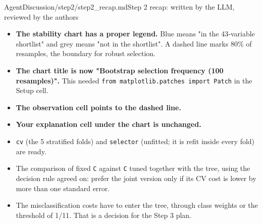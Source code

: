 \begin{mdfile}{AgentDiscussion/\allowbreak{}step2/\allowbreak{}step2\_recap.md}{Step 2 recap: written by the LLM, reviewed by the authors}
\begin{itemize}
\tightlist
\item
  \textbf{The stability chart has a proper legend.} Blue means "in the 43-variable shortlist" and grey means "not in the shortlist". A dashed line marks 80\% of resamples, the boundary for robust selection.
\item
  \textbf{The chart title is now "Bootstrap selection frequency (100 resamples)".} This needed \texttt{from\ matplotlib.patches\ import\ Patch} in the Setup cell.
\item
  \textbf{The observation cell points to the dashed line.}
\item
  \textbf{Your explanation cell under the chart is unchanged.}
\end{itemize}


\begin{itemize}
\tightlist
\item
  \texttt{cv} (the 5 stratified folds) and \texttt{selector} (unfitted; it is refit inside every fold) are ready.
\item
  The comparison of fixed \texttt{C} against \texttt{C} tuned together with the tree, using the decision rule agreed on: prefer the joint version only if its CV cost is lower by more than one standard error.
\item
  The misclassification costs have to enter the tree, through class weights or the threshold of 1/11. That is a decision for the Step 3 plan.
\end{itemize}
\end{mdfile}

